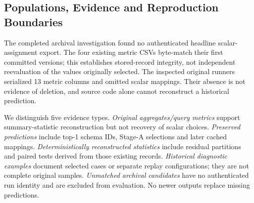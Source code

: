 \subsection{Populations, Evidence and Reproduction Boundaries}
\label{app:reproduction}

The completed archival investigation found no authenticated headline scalar-assignment export. The four existing metric CSVs byte-match their first committed versions; this establishes stored-record integrity, not independent reevaluation of the values originally selected. The inspected original runners serialized 13 metric columns and omitted scalar mappings. Their absence is not evidence of deletion, and source code alone cannot reconstruct a historical prediction.

We distinguish five evidence types. \emph{Original aggregates/query metrics} support summary-statistic reconstruction but not recovery of scalar choices. \emph{Preserved predictions} include top-1 schema IDs, Stage-A selections and later cached mappings. \emph{Deterministically reconstructed statistics} include residual partitions and paired tests derived from those existing records. \emph{Historical diagnostic examples} document selected cases or separate replay configurations; they are not complete original samples. \emph{Unmatched archival candidates} have no authenticated run identity and are excluded from evaluation. No newer outputs replace missing predictions.

